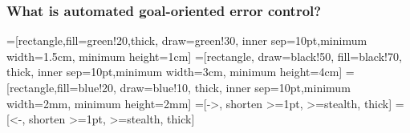\begin{frame}
  \frametitle{What is automated goal-oriented error control?}

  \begin{center}
    =[rectangle,fill=green!20,thick, draw=green!30,
      inner sep=10pt,minimum width=1.5cm, minimum height=1cm]
    =[rectangle, draw=black!50, fill=black!70, thick,
      inner sep=10pt,minimum width=3cm, minimum height=4cm]
    =[rectangle,fill=blue!20, draw=blue!10, thick,
      inner sep=10pt,minimum width=2mm, minimum height=2mm]
    =[->, shorten >=1pt, >=stealth, thick]
    =[<-, shorten >=1pt, >=stealth, thick]

  \end{center}


\end{frame}
